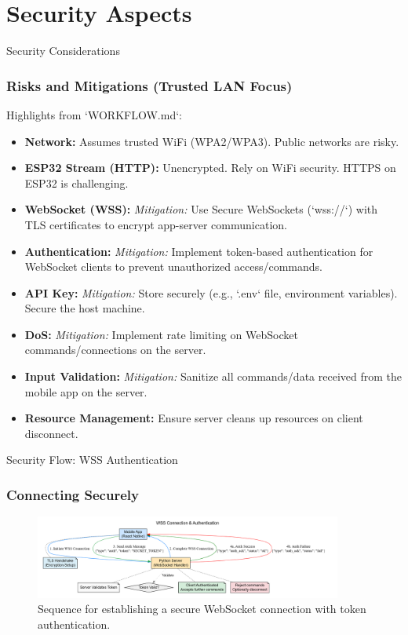\documentclass{beamer}
\begin{document}
\section{Security Aspects}

\begin{frame}{Security Considerations}
    \frametitle{Risks and Mitigations (Trusted LAN Focus)}
     Highlights from `WORKFLOW.md`:
     \begin{itemize}
        \item \textbf{Network:} Assumes trusted WiFi (WPA2/WPA3). Public networks are risky.
        \item \textbf{ESP32 Stream (HTTP):} Unencrypted. Rely on WiFi security. HTTPS on ESP32 is challenging.
        \item \textbf{WebSocket (WSS):} \textit{Mitigation:} Use Secure WebSockets (`wss://`) with TLS certificates to encrypt app-server communication.
        \item \textbf{Authentication:} \textit{Mitigation:} Implement token-based authentication for WebSocket clients to prevent unauthorized access/commands.
        \item \textbf{API Key:} \textit{Mitigation:} Store securely (e.g., `.env` file, environment variables). Secure the host machine.
        \item \textbf{DoS:} \textit{Mitigation:} Implement rate limiting on WebSocket commands/connections on the server.
        \item \textbf{Input Validation:} \textit{Mitigation:} Sanitize all commands/data received from the mobile app on the server.
        \item \textbf{Resource Management:} Ensure server cleans up resources on client disconnect.
     \end{itemize}
\end{frame}

\begin{frame}{Security Flow: WSS Authentication}
    \frametitle{Connecting Securely}
     \begin{figure}
        \centering
        \includegraphics[width=0.9\textwidth, height=0.7\textheight, keepaspectratio]{Security_Flow_Diagram.png}
        \caption{Sequence for establishing a secure WebSocket connection with token authentication.}
    \end{figure}
\end{frame}
\end{document}
